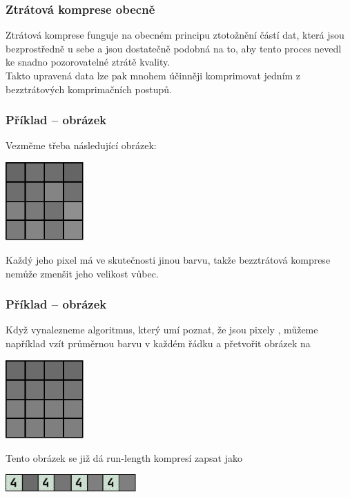 \documentclass[aspectratio=169,11pt,svgnames,handout]{beamer}
\begin{document}
\begin{frame}
 \frametitle{Ztrátová komprese obecně}
 Ztrátová komprese funguje na obecném principu ztotožnění částí dat, která jsou
 bezprostředně u sebe a jsou dostatečně podobná na to, aby tento proces nevedl
 ke snadno pozorovatelné ztrátě kvality.\pause\\
 Takto upravená data lze pak mnohem účinněji komprimovat jedním z
 \alert{bezztrátových} komprimačních postupů.
\end{frame}

\begin{frame}
 \frametitle{Příklad -- obrázek}
 Vezměme třeba následující obrázek:
 \begin{center}
  \includegraphics[width=3cm]{lossy-1.pdf}
 \end{center}
 \pause
 Každý jeho pixel má ve skutečnosti jinou barvu, takže bezztrátová komprese
 nemůže zmenšit jeho velikost vůbec.
\end{frame}

\begin{frame}
 \frametitle{Příklad -- obrázek}
 Když vynalezneme algoritmus, který umí poznat, že jsou pixely , můžeme například vzít průměrnou barvu v každém řádku a přetvořit
 obrázek na
 \begin{center}
  \includegraphics[width=3cm]{lossy-2.pdf}
  \vspace*{-.5em}
 \end{center}
 \pause
 Tento obrázek se již dá run-length kompresí zapsat jako
 \begin{center}
  \includegraphics[width=5cm]{lossy-3.pdf}
  \vspace*{-.5em}
 \end{center}
\end{frame}
\end{document}
